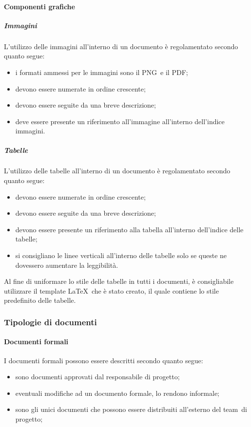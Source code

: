 \documentclass[../NormeProgetto.tex]{subfiles}
\begin{document}
		\paragraph{Componenti grafiche}
			\subparagraph{Immagini}
				L'utilizzo delle immagini all'interno di un documento è regolamentato secondo quanto segue:
				\begin{itemize}
					\item i formati ammessi per le immagini sono il PNG\g\ e il PDF\g;
					\item devono essere numerate in ordine crescente;
					\item devono essere seguite da una breve descrizione;
					\item deve essere presente un riferimento all'immagine all'interno dell'indice immagini.
				\end{itemize}
			\subparagraph{Tabelle}
				L'utilizzo delle tabelle all'interno di un documento è regolamentato secondo quanto segue:
				\begin{itemize}
					\item devono essere numerate in ordine crescente;
					\item devono essere seguite da una breve descrizione;
					\item devono essere presente un riferimento alla tabella all'interno dell'indice delle tabelle;
					\item si consigliano le linee verticali all'interno delle tabelle solo se queste ne dovessero aumentare la leggibilità.
				\end{itemize}
				Al fine di uniformare lo stile delle tabelle in tutti i documenti, è consigliabile utilizzare il template \LaTeX\ che è stato creato, il quale contiene lo stile predefinito delle tabelle.
			
	\subsubsection{Tipologie di documenti}
		\paragraph{Documenti formali}
			I documenti formali possono essere descritti secondo quanto segue:
			\begin{itemize}
				\item sono documenti approvati dal responsabile di progetto;
				\item eventuali modifiche ad un documento formale, lo rendono informale;
				\item sono gli unici documenti che possono essere distribuiti all'esterno del team\g\ di progetto;
			\end{itemize}
		
\end{document}
